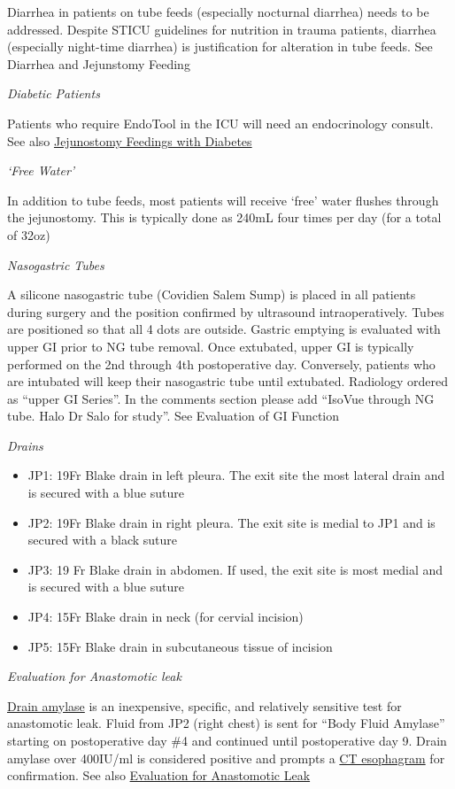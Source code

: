 \documentclass[
]{book}
\providecommand{\tightlist}{%
  \setlength{\itemsep}{0pt}\setlength{\parskip}{0pt}}
\begin{document}
Diarrhea in patients on tube feeds (especially nocturnal diarrhea) needs to be addressed. Despite STICU guidelines for nutrition in trauma patients, diarrhea (especially night-time diarrhea) is justification for alteration in tube feeds. See Diarrhea and Jejunstomy Feeding

\emph{Diabetic Patients}

Patients who require EndoTool in the ICU will need an endocrinology consult. See also \protect\hyperlink{jejunostomy_diabetes}{Jejunostomy Feedings with Diabetes}

\emph{`Free Water'}

In addition to tube feeds, most patients will receive `free' water flushes through the jejunostomy. This is typically done as 240mL four times per day (for a total of 32oz)

\emph{Nasogastric Tubes}

A silicone nasogastric tube (Covidien Salem Sump) is placed in all patients during surgery and the position confirmed by ultrasound intraoperatively. Tubes are positioned so that all 4 dots are outside. Gastric emptying is evaluated with upper GI prior to NG tube removal. Once extubated, upper GI is typically performed on the 2nd through 4th postoperative day. Conversely, patients who are intubated will keep their nasogastric tube until extubated. Radiology ordered as ``upper GI Series''. In the comments section please add ``IsoVue through NG tube. Halo Dr Salo for study''. See Evaluation of GI Function

\emph{Drains}

\begin{itemize}
\tightlist
\item
  JP1: 19Fr Blake drain in left pleura. The exit site the most lateral drain and is secured with a blue suture
\item
  JP2: 19Fr Blake drain in right pleura. The exit site is medial to JP1 and is secured with a black suture
\item
  JP3: 19 Fr Blake drain in abdomen. If used, the exit site is most medial and is secured with a blue suture
\item
  JP4: 15Fr Blake drain in neck (for cervial incision)
\item
  JP5: 15Fr Blake drain in subcutaneous tissue of incision
\end{itemize}

\emph{Evaluation for Anastomotic leak}

\protect\hyperlink{drain_amylase}{Drain amylase} is an inexpensive, specific, and relatively sensitive test for anastomotic leak. Fluid from JP2 (right chest) is sent for ``Body Fluid Amylase'' starting on postoperative day \#4 and continued until postoperative day 9. Drain amylase over 400IU/ml is considered positive and prompts a \protect\hyperlink{ct_esophagram}{CT esophagram} for confirmation. See also \protect\hyperlink{leak_evaluation}{Evaluation for Anastomotic Leak}
\end{document}
